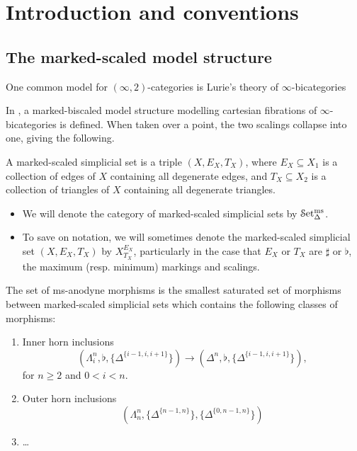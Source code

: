 \documentclass[main.tex]{subfiles}
\begin{document}
\section{Introduction and conventions}
\label{sec:introduction_and_conventions}

\subsection{The marked-scaled model structure}
\label{ssc:marked_scaled_model_structure}

One common model for $(\infty,2)$-categories is Lurie's theory of $\infty$-bicategories

In \cite{garcia20212}, a marked-biscaled model structure modelling cartesian fibrations of $\infty$-bicategories is defined. When taken over a point, the two scalings collapse into one, giving the following.

\begin{definition}
  \label{def:marked-scaled_simplicial_set}
  A marked-scaled simplicial set is a triple $(X, E_{X}, T_{X})$, where $E_{X} \subseteq X_{1}$ is a collection of edges of $X$ containing all degenerate edges, and $T_{X} \subseteq X_{2}$ is a collection of triangles of $X$ containing all degenerate triangles.
\end{definition}

\begin{notation}
  \begin{itemize}
    \item We will denote the category of marked-scaled simplicial sets by $\mathcal{S}\mathrm{et}_{\Delta}^{\mathrm{ms}}$.

    \item To save on notation, we will sometimes denote the marked-scaled simplicial set $(X, E_{X}, T_{X})$ by $X^{E_{X}}_{T_{X}}$, particularly in the case that $E_{X}$ or $T_{X}$ are $\sharp$ or $\flat$, the maximum (resp. minimum) markings and scalings.
  \end{itemize}
\end{notation}

\begin{definition}
  \label{def:ms-anodyne_generators}
  The set of ms-anodyne morphisms is the smallest saturated set of morphisms between marked-scaled simplicial sets which contains the following classes of morphisms:
  \begin{enumerate}
    \item Inner horn inclusions
      \begin{equation*}
        (\Lambda^{n}_{i}, \flat, \{\Delta^{\{i-1,i,i+1\}}\}) \to (\Delta^{n}, \flat, \{\Delta^{\{i-1,i,i+1\}}\}),
      \end{equation*}
      for $n \geq 2$ and $0 < i < n$.

    \item Outer horn inclusions
      \begin{equation*}
        (\Lambda^{n}_{n}, \{\Delta^{\{n-1,n\}}\}, \{\Delta^{\{0, n-1, n\}}\})
      \end{equation*}

    \item \dots
  \end{enumerate}
\end{definition}
\end{document}
